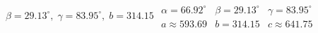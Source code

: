 { $\beta = 29.13^{\circ}, \; \gamma = 83.95^{\circ}, \; b = 314.15$}
{$\begin{array}{lll}\alpha = 66.92^{\circ} & \beta = 29.13^{\circ} & \gamma = 83.95^{\circ} \\a \approx 593.69 & b = 314.15 & c \approx 641.75 \end{array}$}
